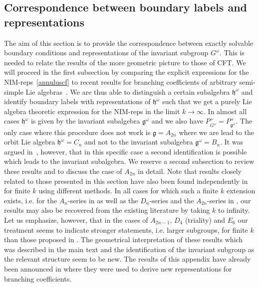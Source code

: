 \documentclass[12pt,a4paper]{article}
\newcommand{\mf}{\mathfrak} %
\def\iG{G^\omega} %
\def\sg{\mf{h}^\omega} %
\def\ig{\mf{g}^\omega} %
\begin{document}
\newpage
\begin{appendix}

\section{\label{sc:Correspondence}Correspondence between boundary 
labels and representations}

  The aim of this section is to provide the correspondence between exactly 
  solvable boundary conditions and representations of the invariant subgroup
  $\iG$. This is needed to relate the results of the more geometric 
  picture to those of CFT. We will proceed in the first subsection by comparing
  the explicit expressions for the NIM-reps~\eqref{annuluscf} to recent results
  for branching coefficients of arbitrary semi-simple Lie
  algebras~\cite{Quella:2001wh}. We are thus able to distinguish a
  certain subalgebra $\sg$ and identify boundary labels with
  representations of $\sg$ such that we get a purely Lie algebra theoretic
  expression for the NIM-reps in the limit $k\to\infty$. In almost all cases
  $\sg$ is given by the invariant subalgebra $\ig$ and we also have
  $P_{\iG}^+=P_{\ig}^+$. The only case where this procedure does not work
  is $\mf{g}=A_{2n}$ where we are lead to the orbit Lie algebra $\sg=C_n$
  and not to the invariant subalgebra $\ig=B_n$.
  It was argued in~\cite{Quella:2001wh}, however, that in
  this specific case a second identification is possible which leads to the
  invariant subalgebra.
  We reserve a second subsection to review
  these results and to discuss the case of $A_{2n}$ in detail. Note that
  results closely related to those presented in this section have also been
  found independently in~\cite{Petkova:2002yj,Gaberdiel:2002qa} for finite $k$
  using different methods. In all cases for which such a finite $k$ extension
  exists, i.e. for the $A_n$-series in \cite{Petkova:2002yj} as well as the
  $D_n$-series and the $A_{2n}$-series
  in \cite{Gaberdiel:2002qa}, our results may also be recovered from the
  existing literature by taking $k$ to infinity.
  Let us emphasize, however, that in the cases of $A_{2n-1}$,
  $D_4$ (triality) and $E_6$ our treatment seems to indicate stronger
  statements, i.e. larger subgroups, for finite $k$ than those proposed
  in \cite{Gaberdiel:2002qa}. The geometrical
  interpretation of these results which was described in the main text and the
  identification of the invariant subgroup as the relevant structure seem to
  be new. The results of this appendix have already been announced in
  \cite{Quella:2001wh} where they were used to derive new
  representations for branching coefficients.


\end{appendix}
\end{document}
